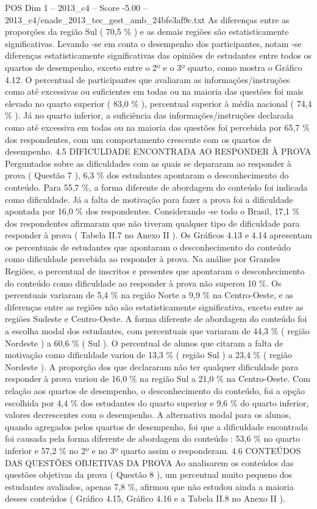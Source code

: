 \begin{textsample}{POS Dim 1 – 2013\_c4 – Score -5.00 – 2013\_c4/enade\_2013\_tec\_gest\_amb\_24bfe3af9c.txt}
As diferenças entre as proporções da região Sul ( 70,5 \% ) e as demais regiões são estatisticamente significativas.
Levando -se em conta o desempenho dos participantes, notam -se diferenças estatisticamente significativas das opiniões de estudantes entre todos os quartos de desempenho, exceto entre o 2º e o 3º quarto, como mostra o Gráfico 4.12.
O percentual de participantes que avaliaram as informações/instruções como até excessivas ou suficientes em todas ou na maioria das questões foi mais elevado no quarto superior ( 83,0 \% ), percentual superior à média nacional ( 74,4 \% ).
Já no quarto inferior, a suficiência das informações/instruções declarada como até excessiva em todas ou na maioria das questões foi percebida por 65,7 \% dos respondentes, com um comportamento crescente com os quartos de desempenho. 4.5 DIFICULDADE ENCONTRADA AO RESPONDER À PROVA Perguntados sobre as dificuldades com as quais se depararam ao responder à prova ( Questão 7 ), 6,3 \% dos estudantes apontaram o desconhecimento do conteúdo.
Para 55,7 \%, a forma diferente de abordagem do conteúdo foi indicada como dificuldade.
Já a falta de motivação para fazer a prova foi a dificuldade apontada por 16,0 \% dos respondentes.
Considerando -se todo o Brasil, 17,1 \% dos respondentes afirmaram que não tiveram qualquer tipo de dificuldade para responder à prova ( Tabela II.7 no Anexo II ).
Os Gráficos 4.13 e 4.14 apresentam os percentuais de estudantes que apontaram o desconhecimento do conteúdo como dificuldade percebida ao responder à prova.
Na análise por Grandes Regiões, o percentual de inscritos e presentes que apontaram o desconhecimento do conteúdo como dificuldade ao responder à prova não superou 10 \%.
Os percentuais variaram de 5,4 \% na região Norte a 9,9 \% na Centro-Oeste, e as diferenças entre as regiões não são estatisticamente significativa, exceto entre as regiões Sudeste e Centro-Oeste.
A forma diferente de abordagem do conteúdo foi a escolha modal dos estudantes, com percentuais que variaram de 44,3 \% ( região Nordeste ) a 60,6 \% ( Sul ).
O percentual de alunos que citaram a falta de motivação como dificuldade variou de 13,3 \% ( região Sul ) a 23,4 \% ( região Nordeste ).
A proporção dos que declararam não ter qualquer dificuldade para responder à prova variou de 16,0 \% na região Sul a 21,0 \% na Centro-Oeste.
Com relação aos quartos de desempenho, o desconhecimento do conteúdo, foi a opção escolhida por 4,4 \% dos estudantes do quarto superior e 9,6 \% do quarto inferior, valores decrescentes com o desempenho.
A alternativa modal para os alunos, quando agregados pelos quartos de desempenho, foi que a dificuldade encontrada foi causada pela forma diferente de abordagem do conteúdo : 53,6 \% no quarto inferior e 57,2 \% no 2º e no 3º quarto assim o responderam. 4.6 CONTEÚDOS DAS QUESTÕES OBJETIVAS DA PROVA Ao analisarem os conteúdos das questões objetivas da prova ( Questão 8 ), um percentual muito pequeno dos estudantes avaliados, apenas 7,8 \%, afirmou que não estudou ainda a maioria desses conteúdos ( Gráfico 4.15, Gráfico 4.16 e a Tabela II.8 no Anexo II ).

\end{textsample}
